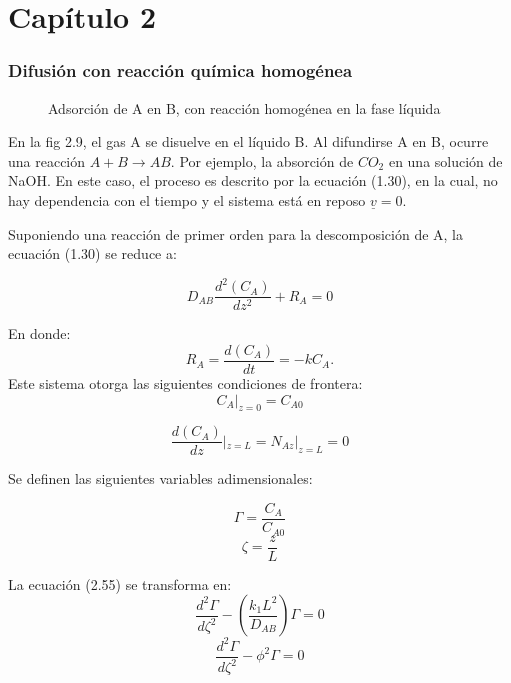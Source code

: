 \chapter{Capítulo 2}
\maketitle

\subsection{Difusión con reacción química homogénea}

\begin{figure}
    \centering
    \caption{Adsorción de A en B, con reacción homogénea en la fase líquida}
\end{figure}

En la fig 2.9, el gas A se disuelve en el líquido B. Al difundirse A en B, ocurre una reacción $A+B\xrightarrow{}AB$. Por ejemplo, la absorción de $CO_2$ en una solución de NaOH.
En este caso, el proceso es descrito por la ecuación (1.30), en la cual, no hay dependencia con el tiempo y el sistema está en reposo $\underline{v}=0$. 

Suponiendo una reacción de primer orden para la descomposición de A, la ecuación (1.30) se reduce a:

\begin{equation}   
 D_{AB}\frac{d^2(C_A)}{dz^2}+R_A=0
\end{equation}


En donde:\begin{equation}
    R_A=\frac{d(C_A)}{dt}=-kC_A.   
\end{equation}
Este sistema otorga las siguientes condiciones de frontera:
\begin{equation}
    C_A|_{z=0}=C_{A0}  
\end{equation}

\begin{equation}
    \frac{d(C_A)}{dz}|_{z=L}=N_{Az}|_{z=L}=0
\end{equation}

Se definen las siguientes variables adimensionales:

$$\Gamma=\frac{C_A}{C_{A0}}$$ $$\zeta=\frac{z}{L}$$

La ecuación (2.55) se transforma en:
\begin{equation}
    \frac{d^2\Gamma}{d\zeta^2}-(\frac{k_1L^2}{D_{AB}})\Gamma=0
\end{equation}
\begin{equation}
  \frac{d^2\Gamma}{d\zeta^2}-\phi^2\Gamma=0  
\end{equation}

